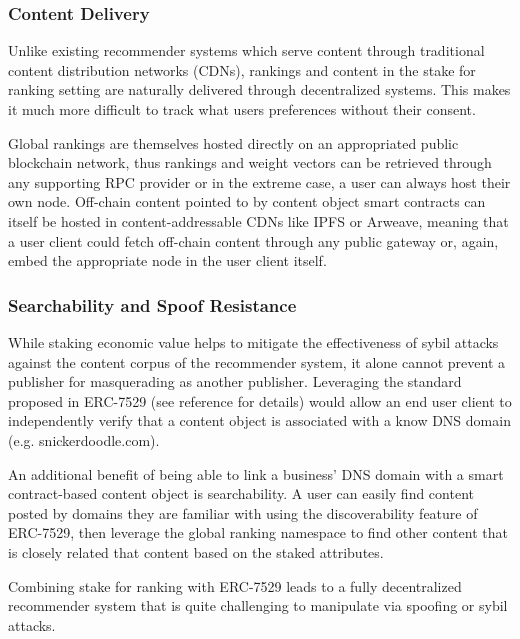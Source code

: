 \subsubsection{Content Delivery}

Unlike existing recommender systems which serve content through traditional content distribution networks (CDNs), rankings and content in the stake for ranking setting are naturally delivered through decentralized systems. This makes it much more difficult to track what users preferences without their consent. 

Global rankings are themselves hosted directly on an appropriated public blockchain network, thus rankings and weight vectors can be retrieved through any supporting RPC provider or in the extreme case, a user can always host their own node. Off-chain content pointed to by content object smart contracts can itself be hosted in content-addressable CDNs like IPFS or Arweave, meaning that a user client could fetch off-chain content through any public gateway or, again, embed the appropriate node in the user client itself. 

\subsubsection{Searchability and Spoof Resistance}

While staking economic value helps to mitigate the effectiveness of sybil attacks against the content corpus of the recommender system, it alone cannot prevent a publisher for masquerading as another publisher. Leveraging the standard proposed in ERC-7529 (see reference \cite{chapman2023erc7529} for details) would allow an end user client to independently verify that a content object is associated with a know DNS domain (e.g. snickerdoodle.com). 

An additional benefit of being able to link a business' DNS domain with a smart contract-based content object is searchability. A user can easily find content posted by domains they are familiar with using the discoverability feature of ERC-7529, then leverage the global ranking namespace to find other content that is closely related that content based on the staked attributes. 

Combining stake for ranking with ERC-7529 leads to a fully decentralized recommender system that is quite challenging to manipulate via spoofing or sybil attacks. 
